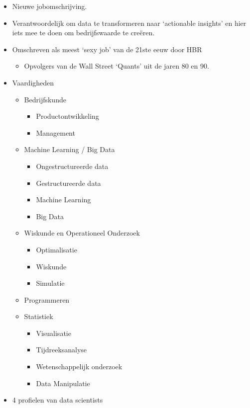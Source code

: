 \documentclass[]{tufte-book}
\providecommand{\tightlist}{%
  \setlength{\itemsep}{0pt}\setlength{\parskip}{0pt}}
\begin{document}
\begin{itemize}
\tightlist
\item
  Nieuwe jobomschrijving.
\item
  Verantwoordelijk om data te transformeren naar `actionable insights' en hier iets mee te doen om bedrijfswaarde te creëren.
\item
  Omschreven als meest `sexy job' van de 21ste eeuw door HBR

  \begin{itemize}
  \tightlist
  \item
    Opvolgers van de Wall Street `Quants' uit de jaren 80 en 90.
  \end{itemize}
\item
  Vaardigheden

  \begin{itemize}
  \tightlist
  \item
    Bedrijfskunde

    \begin{itemize}
    \tightlist
    \item
      Productontwikkeling
    \item
      Management
    \end{itemize}
  \item
    Machine Learning / Big Data

    \begin{itemize}
    \tightlist
    \item
      Ongestructureerde data
    \item
      Gestructureerde data
    \item
      Machine Learning
    \item
      Big Data
    \end{itemize}
  \item
    Wiskunde en Operationeel Onderzoek

    \begin{itemize}
    \tightlist
    \item
      Optimalisatie
    \item
      Wiskunde
    \item
      Simulatie
    \end{itemize}
  \item
    Programmeren
  \item
    Statistiek

    \begin{itemize}
    \tightlist
    \item
      Visualisatie
    \item
      Tijdreeksanalyse
    \item
      Wetenschappelijk onderzoek
    \item
      Data Manipulatie
    \end{itemize}
  \end{itemize}
\item
  4 profielen van data scientists


\end{itemize}
\end{document}
